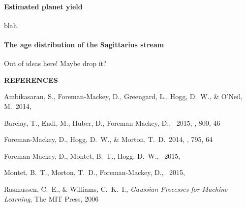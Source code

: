 \documentclass[letterpaper,12pt,preprint]{hack_aastex}
\begin{document}
\paragraph{Estimated planet yield} blah.

\paragraph{The age distribution of the Sagittarius stream}

Out of ideas here! Maybe drop it?



\begin{multicols}{2}
{\centering\bf REFERENCES\par}
\vspace{0.2em}
\begin{thebibliography}{}%
\raggedright\raggedbottom\scriptsize\setlength{\parskip}{-0.5em}%

Ambikasaran, S., Foreman-Mackey, D., Greengard, L., Hogg, D.~W.,
\& O'Neil, M.\ 2014, 

Barclay, T., Endl, M., Huber, D., Foreman-Mackey, D., \etal\ 2015, \apj, 800,
46

Foreman-Mackey, D., Hogg, D.~W., \& Morton, T.~D.\ 2014, \apj, 795, 64

Foreman-Mackey, D., Montet, B.~T., Hogg, D.~W., \etal\ 2015, 

Montet, B.~T., Morton, T.~D., Foreman-Mackey, D., \etal\ 2015,

Rasmussen, C.~E., \& Williams, C.~K.~I., \emph{Gaussian Processes for Machine
Learning}, The MIT Press, 2006

\end{thebibliography}
\end{multicols}
\end{document}
